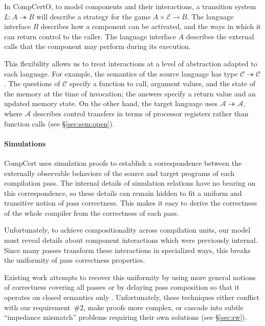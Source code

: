 In CompCertO,
to model components and their interactions,
a transition system $L : A \twoheadrightarrow B$
will describe a strategy
for the game
$A \times \mathcal{E} \rightarrow B$.
The language interface $B$ describes how a component can be activated,
and the ways in which it can return control to the caller.
The language interface $A$ describes the external calls that the component
may perform during its execution.

This flexibility allows us to treat interactions
at a level of abstraction adapted to each language.
For example,
the semantics of
the source language  has type
\mbox{$\mathcal{C} \twoheadrightarrow \mathcal{C}$}.
The questions of $\mathcal{C}$ specify a function to call,
argument values,
and the state of the memory at the time of invocation;
the answers specify a return value and an updated memory state.
On the other hand, the target language  uses
$\mathcal{A} \twoheadrightarrow \mathcal{A}$,
where $\mathcal{A}$ describes control transfers
in terms of processor registers
rather than function calls (see \S\ref{sec:sem:open}).



\paragraph{Simulations} %

CompCert uses simulation proofs
to establish a correspondence between
the externally observable behaviors of
the source and target programs of each compilation pass.
The internal details of simulation relations
have no bearing on this correspondence,
so these details can remain hidden
to fit a uniform and transitive notion of pass correctness.
This makes it easy to derive the correctness
of the whole compiler
from the correctness of each pass.

Unfortunately,
to achieve compositionality across compilation units,
our model must reveal details
about component interactions
which were previously internal.
Since many passes transform
these interactions in
specialized ways,
this breaks the uniformity
of pass correctness properties.

Existing work attempts to recover this uniformity
by using more general notions of correctness
covering all passes
\cite{compcompcert,compcertm}
or by delaying pass composition so that
it operates on closed semantics only
\cite{sepcompcert,compcertm}.
Unfortunately, these techniques either
conflict with our requirement~\#2,
make proofs more complex,
or cascade into subtle ``impedance mismatch'' problems
requiring their own solutions
(see \S\ref{sec:rw}).

